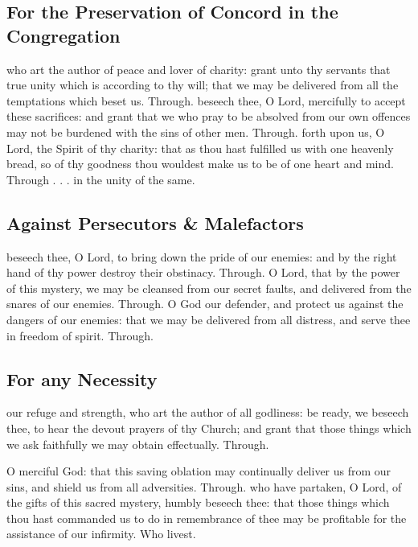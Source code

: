 \begin{multicols}{2}
   \newcolumn

\subsection{For the Preservation of Concord in the Congregation}
\collect
{} who art the author of peace and lover of charity: grant unto thy servants that true unity which is according to thy will; that we may be delivered from all the temptations which beset us. Through.
\secret
{} beseech thee, O Lord, mercifully to accept these sacrifices: and grant that we who pray to be absolved from our own offences may not be burdened with the sins of other men. Through.
\postcommunion
{} forth upon us, O Lord, the Spirit of thy charity: that as thou hast fulfilled us with one heavenly bread, so of thy goodness thou wouldest make us to be of one heart and mind. Through . . . in the unity of the same.

   \newcolumn


\subsection{Against Persecutors \& Malefactors}
\collect
{} beseech thee, O Lord, to bring down the pride of our enemies: and by the right hand of thy power destroy their obstinacy. Through.
\secret
{} O Lord, that by the power of this mystery, we may be cleansed from our secret faults, and delivered from the snares of our enemies. Through.
\postcommunion
{} O God our defender, and protect us against the dangers of our enemies: that we may be delivered from all distress, and serve thee in freedom of spirit. Through.

\subsection{For any Necessity}
\collect
{} our refuge and strength, who art the author of all godliness: be ready, we beseech thee, to hear the devout prayers of thy Church; and grant that those things which we ask faithfully we may obtain effectually. Through.

   \newcolumn

\secret
{} O merciful God: that this saving oblation may continually deliver us from our sins, and shield us from all adversities. Through.
\postcommunion
{} who have partaken, O Lord, of the gifts of this sacred mystery, humbly beseech thee: that those things which thou hast commanded us to do in remembrance of thee may be profitable for the assistance of our infirmity. Who livest.


\end{multicols}

